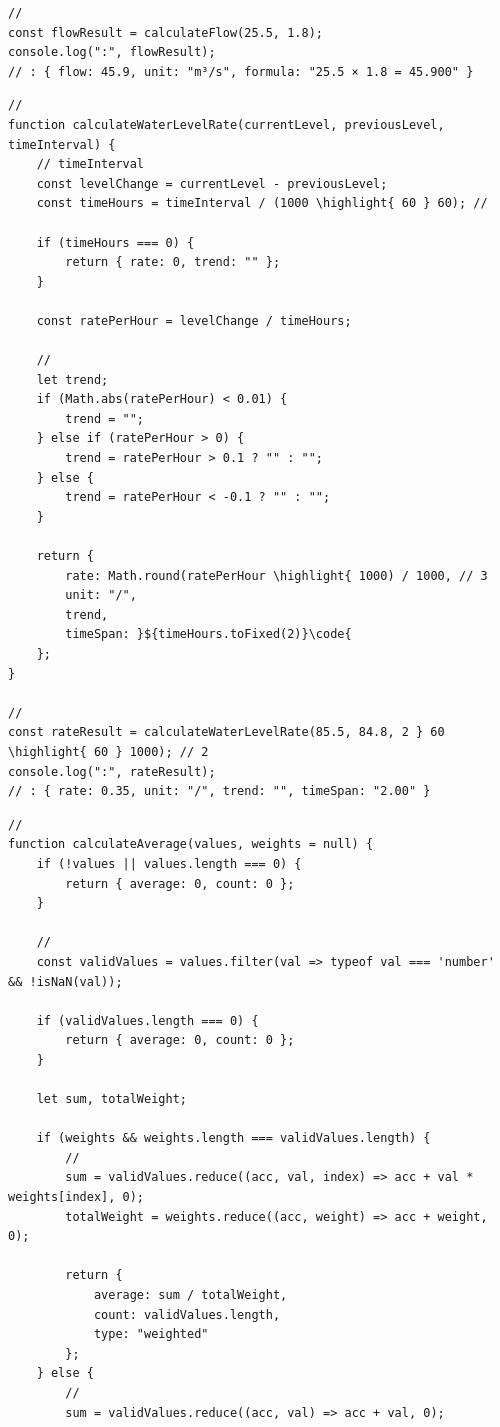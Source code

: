 {\begin{lstlisting}[style=javascript]
// 
const flowResult = calculateFlow(25.5, 1.8);
console.log(":", flowResult);
// : { flow: 45.9, unit: "m³/s", formula: "25.5 × 1.8 = 45.900" }
\end{lstlisting}

\important{}

\begin{lstlisting}[style=javascript]
// 
function calculateWaterLevelRate(currentLevel, previousLevel, timeInterval) {
    // timeInterval
    const levelChange = currentLevel - previousLevel;
    const timeHours = timeInterval / (1000 \highlight{ 60 } 60); // 
    
    if (timeHours === 0) {
        return { rate: 0, trend: "" };
    }
    
    const ratePerHour = levelChange / timeHours;
    
    // 
    let trend;
    if (Math.abs(ratePerHour) < 0.01) {
        trend = "";
    } else if (ratePerHour > 0) {
        trend = ratePerHour > 0.1 ? "" : "";
    } else {
        trend = ratePerHour < -0.1 ? "" : "";
    }
    
    return {
        rate: Math.round(ratePerHour \highlight{ 1000) / 1000, // 3
        unit: "/",
        trend,
        timeSpan: }${timeHours.toFixed(2)}\code{
    };
}

// 
const rateResult = calculateWaterLevelRate(85.5, 84.8, 2 } 60 \highlight{ 60 } 1000); // 2
console.log(":", rateResult);
// : { rate: 0.35, unit: "/", trend: "", timeSpan: "2.00" }
\end{lstlisting}

\important{}

\begin{lstlisting}[style=javascript]
// 
function calculateAverage(values, weights = null) {
    if (!values || values.length === 0) {
        return { average: 0, count: 0 };
    }
    
    // 
    const validValues = values.filter(val => typeof val === 'number' && !isNaN(val));
    
    if (validValues.length === 0) {
        return { average: 0, count: 0 };
    }
    
    let sum, totalWeight;
    
    if (weights && weights.length === validValues.length) {
        // 
        sum = validValues.reduce((acc, val, index) => acc + val * weights[index], 0);
        totalWeight = weights.reduce((acc, weight) => acc + weight, 0);
        
        return {
            average: sum / totalWeight,
            count: validValues.length,
            type: "weighted"
        };
    } else {
        // 
        sum = validValues.reduce((acc, val) => acc + val, 0);
        

\end{lstlisting}}
